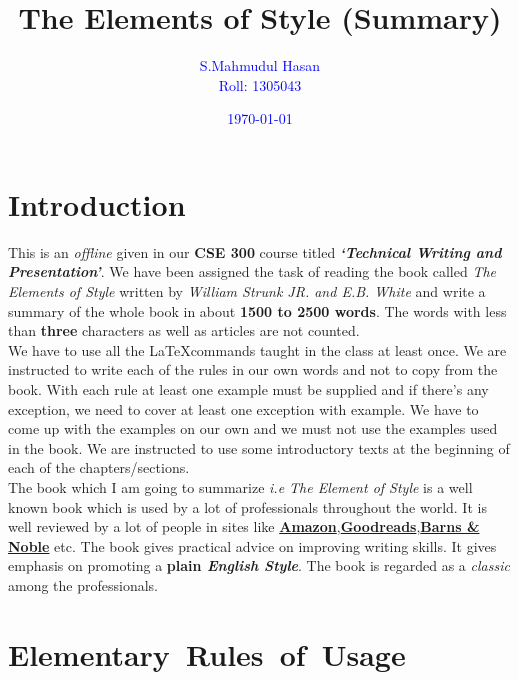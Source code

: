 \documentclass[12pt]{report}
\begin{document}
\title{\textbf{The Elements of Style (Summary)}}
\author{\textcolor{blue}{S.Mahmudul Hasan}\\ \textcolor{blue}{Roll: 1305043}}
\date{\textcolor{blue}{\today}}%
\maketitle
\tableofcontents


\chapter{Introduction}\label{INTRO}

\raggedright  %
This is an \textit{offline} given in our \textbf{CSE 300} course titled \textit{\textbf{`Technical Writing and Presentation'}}. We have been assigned the task of reading the book called \emph{The Elements of Style} written by \emph{William Strunk JR. \emph{and} E.B. White} and write a summary of the whole book in about \textbf{1500 to 2500 words}. The words with less than \textbf{three} characters as well as articles are not counted.\\
We have to use all the \LaTeX commands taught in the class at least once. We are instructed to write each of the rules in our own words and not to copy from the book. With each rule at least one example must be supplied and if there's any exception, we need to cover at least one exception with example. We have to come up with the examples on our own and we must not use the examples used in the book. We are instructed to use some introductory texts at the beginning of each of the chapters/sections.\\
The book which I am going to summarize \textit{i.e The Element of Style} is a well known book which is used by a lot of professionals throughout the world. It is well reviewed by a lot of people in sites like \textbf{\href{https://www.amazon.com/Elements-Style-William-Strunk-Jr/dp/1557427283}{Amazon}},\textbf{\href{http://www.goodreads.com/book/show/33514.The_Elements_of_Style}{Goodreads}},\textbf{\href{http://www.barnesandnoble.com/w/the-elements-of-style-william-strunk/1116794279}{Barns \& Noble}} etc.
The book gives practical advice on improving writing skills. It gives emphasis on promoting a \textbf{plain \textit{English Style}}. The book is regarded as a \emph{classic} among the professionals.




\chapter{\mbox{Elementary Rules of Usage}}\label{ERU}
\end{document}
